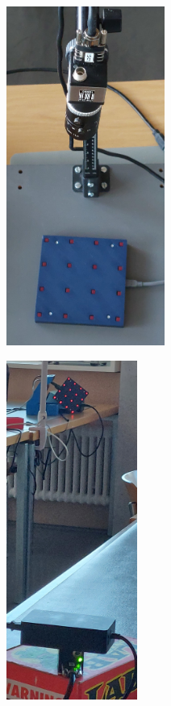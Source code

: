 \noindent\begin{minipage}[t]{\dimexpr.994\linewidth/3}\vspace{0pt}
    \begin{centering}
        \includegraphics[height=30em]{../images/phone/aufbau-normal-cut.jpg}
        \vspace{-1.0em}
        \label{img:Aufbau-Normal}
    \end{centering}
\end{minipage}
\noindent\begin{minipage}[t]{\dimexpr.994\linewidth/3}\vspace{0pt}
    \begin{centering}
        \includegraphics[height=30em]{../images/phone/aufbau-weit-normal-cut.jpg}
        \vspace{-1.0em}
        \label{img:Aufbau-Weit-Normal}
    \end{centering}
\end{minipage}
